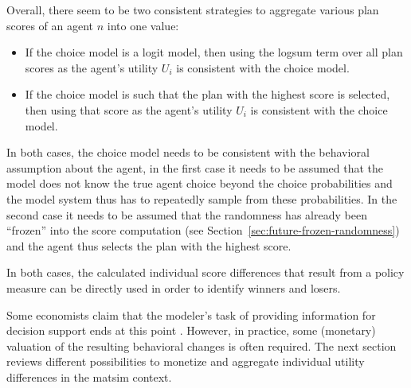 Overall, there seem to be two consistent strategies to aggregate various plan scores of an agent $n$ into one value:
\begin{itemize}\styleItemize

\item If the choice model is a logit model, then using the logsum term over all plan scores as the agent's utility $U_i$ is consistent with the choice model.

\item If the choice model is such that the plan with the highest score is selected, then using that score as the agent's utility $U_i$ is consistent with the choice model.

\end{itemize}
In both cases, the choice model needs to be consistent with the behavioral assumption about the agent, \ie in the first case it needs to be assumed that the model does not know the true agent choice beyond the choice probabilities and the model system thus has to repeatedly sample from these probabilities.  In the second case it needs to be assumed that the randomness has already been ``frozen'' into the score computation (see Section~\ref{sec:future-frozen-randomness}) and the agent thus selects the plan with the highest score.
%

%
In both cases, the calculated individual score differences that result from a policy measure can be directly used in order to identify winners and losers.
%

Some economists claim that the modeler's task of providing information for decision support ends at this point \citep{AhlheimRose1989MessungIndividuellerWohlfahrt}. However, in practice, some (monetary) valuation of the resulting behavioral changes is often required. The next section reviews different possibilities to monetize and aggregate individual utility differences in the \acrshort{matsim} context.

